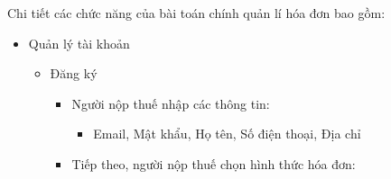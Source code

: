 Chi tiết các chức năng của bài toán chính quản lí hóa đơn bao gồm:

\begin{itemize}

\item Quản lý tài khoản

\begin{itemize}

\item Đăng ký

\begin{itemize}

\item Người nộp thuế nhập các thông tin:

\begin{itemize}

\item Email, Mật khẩu, Họ tên, Số điện thoại, Địa chỉ









\end{itemize}

\item Tiếp theo, người nộp thuế chọn hình thức hóa đơn: %


\end{itemize}
\end{itemize}
\end{itemize}
